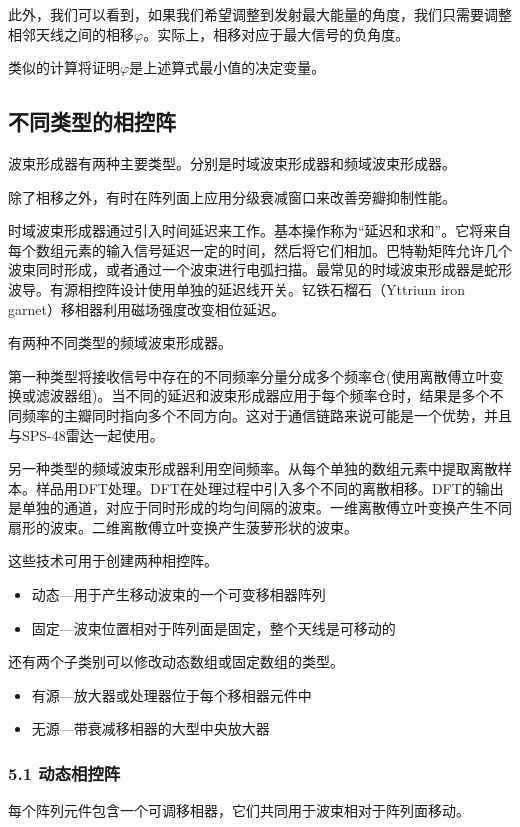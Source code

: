 此外，我们可以看到，如果我们希望调整到发射最大能量的角度，我们只需要调整相邻天线之间的相移$\varphi$。实际上，相移对应于最大信号的负角度。

类似的计算将证明$\varphi$是上述算式最小值的决定变量。

\subsection{不同类型的相控阵}
波束形成器有两种主要类型。分别是时域波束形成器和频域波束形成器。

除了相移之外，有时在阵列面上应用分级衰减窗口来改善旁瓣抑制性能。

时域波束形成器通过引入时间延迟来工作。基本操作称为“延迟和求和”。它将来自每个数组元素的输入信号延迟一定的时间，然后将它们相加。巴特勒矩阵允许几个波束同时形成，或者通过一个波束进行电弧扫描。最常见的时域波束形成器是蛇形波导。有源相控阵设计使用单独的延迟线开关。钇铁石榴石（Yttrium iron garnet）移相器利用磁场强度改变相位延迟。

有两种不同类型的频域波束形成器。

第一种类型将接收信号中存在的不同频率分量分成多个频率仓(使用离散傅立叶变换或滤波器组)。当不同的延迟和波束形成器应用于每个频率仓时，结果是多个不同频率的主瓣同时指向多个不同方向。这对于通信链路来说可能是一个优势，并且与SPS-48雷达一起使用。

另一种类型的频域波束形成器利用空间频率。从每个单独的数组元素中提取离散样本。样品用DFT处理。DFT在处理过程中引入多个不同的离散相移。DFT的输出是单独的通道，对应于同时形成的均匀间隔的波束。一维离散傅立叶变换产生不同扇形的波束。二维离散傅立叶变换产生菠萝形状的波束。

这些技术可用于创建两种相控阵。
\begin{itemize}
\item 动态—用于产生移动波束的一个可变移相器阵列
\item 固定—波束位置相对于阵列面是固定，整个天线是可移动的
\end{itemize}
还有两个子类别可以修改动态数组或固定数组的类型。
\begin{itemize}
\item 有源—放大器或处理器位于每个移相器元件中
\item 无源—带衰减移相器的大型中央放大器
\end{itemize}

\subsubsection{5.1 动态相控阵}
每个阵列元件包含一个可调移相器，它们共同用于波束相对于阵列面移动。

